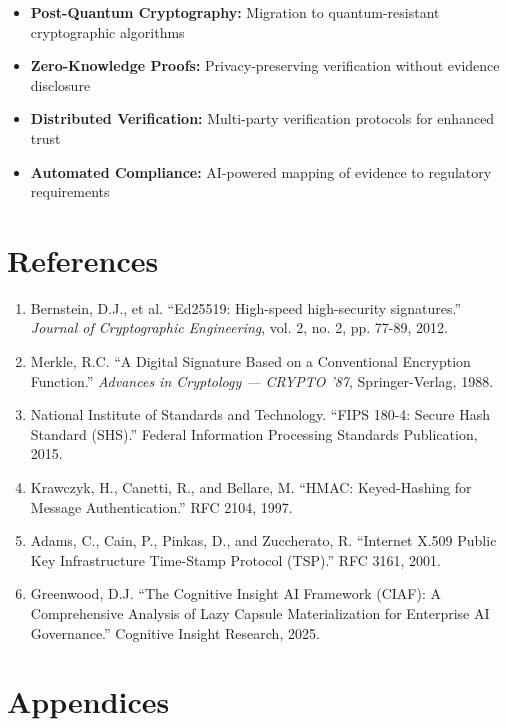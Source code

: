\documentclass[12pt,a4paper]{article}
\begin{document}
\begin{itemize}
\item \textbf{Post-Quantum Cryptography:} Migration to quantum-resistant cryptographic algorithms
\item \textbf{Zero-Knowledge Proofs:} Privacy-preserving verification without evidence disclosure
\item \textbf{Distributed Verification:} Multi-party verification protocols for enhanced trust
\item \textbf{Automated Compliance:} AI-powered mapping of evidence to regulatory requirements
\end{itemize}

\newpage

\section*{References}

\begin{enumerate}
\item Bernstein, D.J., et al. ``Ed25519: High-speed high-security signatures.'' \textit{Journal of Cryptographic Engineering}, vol. 2, no. 2, pp. 77-89, 2012.

\item Merkle, R.C. ``A Digital Signature Based on a Conventional Encryption Function.'' \textit{Advances in Cryptology — CRYPTO '87}, Springer-Verlag, 1988.

\item National Institute of Standards and Technology. ``FIPS 180-4: Secure Hash Standard (SHS).'' Federal Information Processing Standards Publication, 2015.

\item Krawczyk, H., Canetti, R., and Bellare, M. ``HMAC: Keyed-Hashing for Message Authentication.'' RFC 2104, 1997.

\item Adams, C., Cain, P., Pinkas, D., and Zuccherato, R. ``Internet X.509 Public Key Infrastructure Time-Stamp Protocol (TSP).'' RFC 3161, 2001.

\item Greenwood, D.J. ``The Cognitive Insight AI Framework (CIAF): A Comprehensive Analysis of Lazy Capsule Materialization for Enterprise AI Governance.'' Cognitive Insight Research, 2025.
\end{enumerate}

\newpage

\section*{Appendices}
\end{document}
